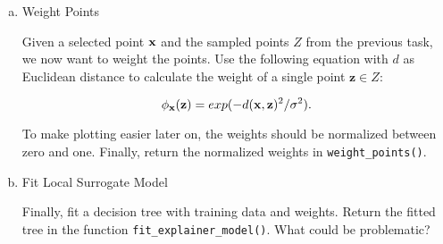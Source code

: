 {\begin{enumerate}[a)]
\item Weight Points

Given a selected point $\mathbf{x}$ and the sampled points $Z$ from the previous task, we now want to weight the points. Use the following equation with $d$ as Euclidean distance to calculate the weight of a single point $\mathbf{z} \in Z$:

\begin{equation}
    \phi_{\mathbf{x}}(\mathbf{z}) = exp(-d(\mathbf{x}, \mathbf{z})^2/\sigma^2).
    \label{eq:dist}
\end{equation}

\noindent To make plotting easier later on, the weights should be normalized between zero and one. Finally, return the normalized weights in \texttt{weight\_points()}.

\item Fit Local Surrogate Model

Finally, fit a decision tree with training data and weights. Return the fitted tree in the function \texttt{fit\_explainer\_model()}. 
What could be problematic?

\end{enumerate}
}
